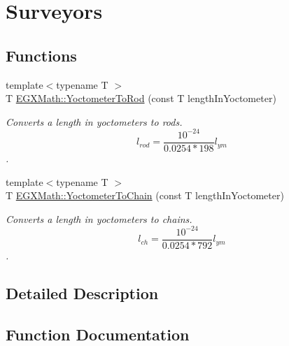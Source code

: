 \hypertarget{group___e_g_x_math-_conversions-_length_conversions-_yoctometer-_surveyors}{}\section{Surveyors}
\label{group___e_g_x_math-_conversions-_length_conversions-_yoctometer-_surveyors}
\subsection*{Functions}
\begin{DoxyCompactItemize}
\item 
{\footnotesize template$<$typename T $>$ }\\T \mbox{\hyperlink{group___e_g_x_math-_conversions-_length_conversions-_yoctometer-_surveyors_gaabe3a5aaa7081b0489d25f0b2117c11b}{E\+G\+X\+Math\+::\+Yoctometer\+To\+Rod}} (const T length\+In\+Yoctometer)
\begin{DoxyCompactList}\small\item\em Converts a length in yoctometers to rods. \[ l_{rod}= \frac{10^{-24}}{0.0254 * 198} l_{ym} \]. \end{DoxyCompactList}\item 
{\footnotesize template$<$typename T $>$ }\\T \mbox{\hyperlink{group___e_g_x_math-_conversions-_length_conversions-_yoctometer-_surveyors_ga982ac95d1a3ac5e02e983e355af983d0}{E\+G\+X\+Math\+::\+Yoctometer\+To\+Chain}} (const T length\+In\+Yoctometer)
\begin{DoxyCompactList}\small\item\em Converts a length in yoctometers to chains. \[ l_{ch}= \frac{10^{-24}}{0.0254 * 792} l_{ym} \]. \end{DoxyCompactList}\end{DoxyCompactItemize}


\subsection{Detailed Description}


\subsection{Function Documentation}
\mbox{\label{group___e_g_x_math-_conversions-_length_conversions-_yoctometer-_surveyors_ga982ac95d1a3ac5e02e983e355af983d0}} 
